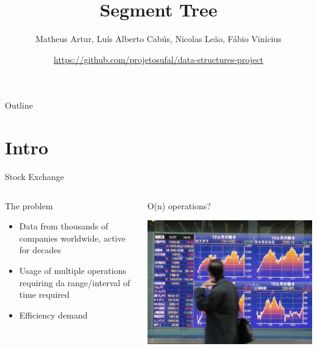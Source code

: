 \documentclass[presentation,9pt]{beamer}
\author{Matheus Artur, Luís Alberto Cabús, Nicolas Leão, Fábio Vinícius}
\date{\url{https://github.com/projetosufal/data-structures-project}}
\title{Segment Tree}
\begin{document}
\maketitle
\begin{frame}{Outline}
\tableofcontents
\end{frame}


\section{Intro}
\label{sec:org6c00d7c}

\begin{frame}[label={sec:org8eef74a}]{Stock Exchange}
\begin{columns}
\begin{column}{0.48\columnwidth}
\begin{block}{The problem}
\begin{itemize}
\item Data from thousands of companies worldwide, active for decades
\item Usage of multiple operations requiring da range/interval of time required
\item Efficiency demand
\end{itemize}
\end{block}
\end{column}

\begin{column}{0.48\columnwidth}
\begin{block}{O(n) operations?}
\begin{center}
\includegraphics[width=.9\linewidth]{./img/serv.png}
\end{center}
\end{block}
\end{column}
\end{columns}
\end{frame}
\end{document}
